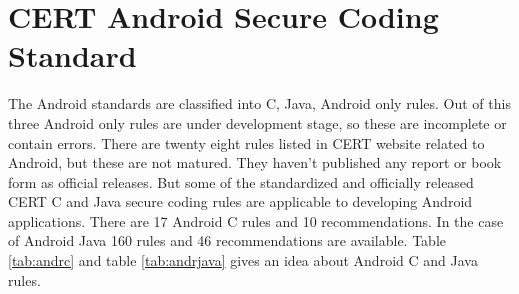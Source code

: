 \section{CERT Android Secure Coding Standard}
 The Android standards are classified into C, Java, Android only rules. Out of this three Android only rules are under development stage, so these  are incomplete or contain errors. There are twenty eight rules listed in CERT website related to Android, but these are not matured. They haven't published any report or book form as official releases. But some of the standardized and officially released CERT C and Java secure coding rules are applicable to developing Android applications. There are 17 Android C rules and 10 recommendations. In the case of Android Java 160 rules and 46 recommendations are available. Table \ref{tab:andrc} and table \ref{tab:andrjava} gives an idea about Android C and Java rules.
 \\
